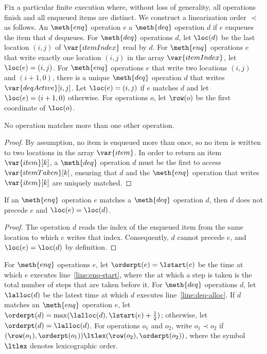 Fix a particular finite execution where, without loss of generality, 
all operations finish and all enqueued items are distinct. 
We construct a linearization order $\prec$ as follows. 
An $\meth{enq}$ operation $e$  
a $\meth{deq}$ operation $d$ 
if $e$ enqueues the item that $d$ dequeues. 
For $\meth{deq}$ operations $d$, 
let $\loc(d)$ be the last location $(i, j)$ 
of $\var{itemIndex}$ read by $d$. 
For $\meth{enq}$ operations $e$ 
that write exactly one location $(i, j)$ 
in the array $\var{itemIndex}$, let $\loc(e) = (i, j)$. 
For $\meth{enq}$ operations $e$ 
that write two locations $(i, j)$ and $(i + 1, 0)$, 
there is a unique $\meth{deq}$ operation $d$ 
that writes $\var{deqActive}[i, j]$. 
Let $\loc(e) = (i, j)$ if $e$ matches $d$ 
and let $\loc(e) = (i + 1, 0)$ otherwise. 
For operations $o$, let $\row(o)$ be the first coordinate of $\loc(o)$. 

\begin{lemma}
\label{lemma:unique-match}
No operation matches more than one other operation. 
\end{lemma}
\begin{proof}
By assumption, 
no item is enqueued more than once, 
so no item is written to two locations in the array $\var{item}$. 
In order to return an item $\var{item}[k]$, 
a $\meth{deq}$ operation $d$ must be the first 
to access $\var{itemTaken}[k]$, 
ensuring that $d$ and the $\meth{enq}$ operation 
that writes $\var{item}[k]$ are uniquely matched. 
\end{proof}

\begin{lemma}
\label{lemma:match-loc}
If an $\meth{enq}$ operation $e$ 
matches a $\meth{deq}$ operation $d$, 
then $d$ does not precede $e$ and $\loc(e) = \loc(d)$. 
\end{lemma}
\begin{proof}
The operation $d$ reads the index of the enqueued item 
from the same location to which $e$ writes that index. 
Consequently, $d$ cannot precede $e$, 
and $\loc(e) = \loc(d)$ by definition. 
\end{proof}

For $\meth{enq}$ operations $e$, 
let $\orderpt(e) = \lstart(e)$ be the time 
at which $e$ executes line~\ref{line:enq-start}, 
where the  at which a step is taken 
is the total number of steps that are taken before it. 
For $\meth{deq}$ operations $d$, 
let $\lalloc(d)$ be the latest time 
at which $d$ executes line~\ref{line:deq-alloc}. 
If $d$ matches an $\meth{enq}$ operation $e$, 
let $\orderpt(d) = \max(\lalloc(d), \lstart(e) + \frac{1}{2})$; 
otherwise, let $\orderpt(d) = \lalloc(d)$. 
For operations $o_1$ and $o_2$, 
write $o_1 \prec o_2$ 
if $(\row(o_1), \orderpt(o_1)) \ltlex (\row(o_2), \orderpt(o_2))$, 
where the symbol $\ltlex$ denotes lexicographic order. 

